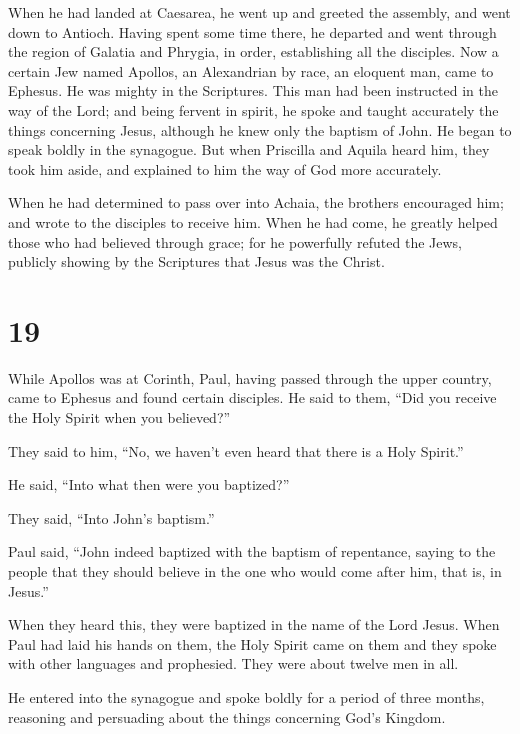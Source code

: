  When he had landed at Caesarea, he went up and greeted
the assembly, and went down to Antioch.  Having spent
some time there, he departed and went through the region of Galatia and
Phrygia, in order, establishing all the disciples.  Now a
certain Jew named Apollos, an Alexandrian by race, an eloquent man, came
to Ephesus. He was mighty in the Scriptures.  This man
had been instructed in the way of the Lord; and being fervent in spirit,
he spoke and taught accurately the things concerning Jesus, although he
knew only the baptism of John.  He began to speak boldly
in the synagogue. But when Priscilla and Aquila heard him, they took him
aside, and explained to him the way of God more accurately.

 When he had determined to pass over into Achaia, the
brothers encouraged him; and wrote to the disciples to receive him. When
he had come, he greatly helped those who had believed through grace;
 for he powerfully refuted the Jews, publicly showing by
the Scriptures that Jesus was the Christ.

\hypertarget{section-18}{%
\section{19}\label{section-18}}

 While Apollos was at Corinth, Paul, having passed through
the upper country, came to Ephesus and found certain disciples.
 He said to them, ``Did you receive the Holy Spirit when
you believed?''

They said to him, ``No, we haven't even heard that there is a Holy
Spirit.''

 He said, ``Into what then were you baptized?''

They said, ``Into John's baptism.''

 Paul said, ``John indeed baptized with the baptism of
repentance, saying to the people that they should believe in the one who
would come after him, that is, in Jesus.''

 When they heard this, they were baptized in the name of
the Lord Jesus.  When Paul had laid his hands on them, the
Holy Spirit came on them and they spoke with other languages and
prophesied.  They were about twelve men in all.

 He entered into the synagogue and spoke boldly for a
period of three months, reasoning and persuading about the things
concerning God's Kingdom.


